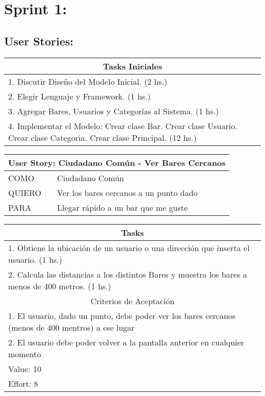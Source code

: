 \section{Sprint 1: }

\subsection{User Stories: }

    
    \begin{table}[H]
        \centering
        \begin{tabular}{| p{12.118cm} |}
            \hline
            \multicolumn{1}{|c|}{Tasks Iniciales} \\
            \hline
            1. Discutir Diseño del Modelo Inicial. (2 hs.) \\ \hline
            2. Elegir Lenguaje y Framework. (1 hs.) \\ \hline
            3. Agregar Bares, Usuarios y Categorías al Sistema. (1 hs.) \\ \hline
            4. Implementar el Modelo: Crear clase Bar. Crear clase Usuario. Crear clase Categoria. Crear clase Principal. (12 hs.) \\ \hline
        \end{tabular}
    \end{table}
    
    \begin{table}[H]
        \centering
        \begin{tabular}{| p{1.5cm}| p{10.2cm} |}
            \hline
            \multicolumn{2}{|c|}{User Story: Ciudadano Común - Ver Bares Cercanos} \\
            \hline
            COMO & Ciudadano Común \\ \hline
            QUIERO & Ver los bares cercanos a un punto dado \\ \hline
            PARA & Llegar rápido a un bar que me guste \\ \hline
            \hline
        \end{tabular}
        \begin{tabular}{| p{12.118cm} |}
            \multicolumn{1}{|c|}{Tasks} \\
            \hline
            1. Obtiene la ubicación de un usuario o una dirección que inserta el usuario. (1 hs.) \\ \hline
            2. Calcula las distancias a los distintos Bares y muestra los bares a menos de 400 metros. (1 hs.)\\ \hline
            \hline
            \multicolumn{1}{|c|}{Criterios de Aceptación} \\
            \hline
            1. El usuario, dado un punto, debe poder ver los bares cercanos (menos de 400 mentros) a ese lugar \\ \hline
            2. El usuario debe poder volver a la pantalla anterior en cualquier momento \\ \hline
            Value: 10 \\ \hline
            Effort: 8 \\ \hline
        \end{tabular}
    \end{table}
    
